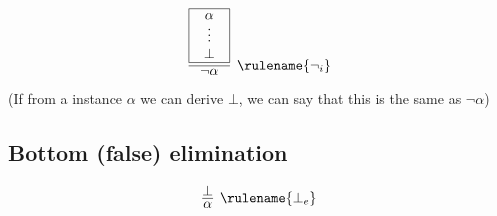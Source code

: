 \documentclass{article}
\begin{document}
    \begin{align*}
      \infer[\rulename{\neg_i}]
      {\neg \alpha}
      {
        \framebox{\parbox{.8cm}{\centerline{$\alpha$}\centerline{$\vdots$}\centerline{$\bot$}}}
      }
    \end{align*}
    (If from a instance $\alpha$ we can derive $\bot$, we can say that this is the same as $\neg\alpha$)
    
\subsection{Bottom (false) elimination}
    \begin{align*}
      \infer[\rulename{\bot_e}]
      {\alpha}
      {\bot}
    \end{align*}
\end{document}
